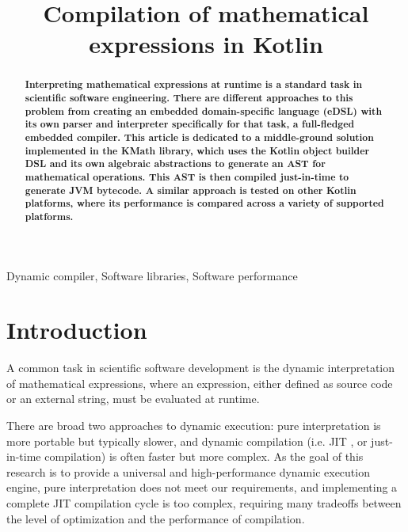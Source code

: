 \documentclass[conference]{IEEEtran}
\begin{document}
\title{Compilation of mathematical expressions in Kotlin}

\author{
}

\maketitle

\begin{abstract}
\textbf{Interpreting mathematical expressions at runtime is a standard task in scientific software engineering. There are different approaches to this problem from creating an embedded domain-specific language (eDSL) with its own parser and interpreter specifically for that task, a full-fledged embedded compiler. This article is dedicated to a middle-ground solution implemented in the KMath library, which uses the Kotlin object builder DSL and its own algebraic abstractions to generate an AST for mathematical operations. This AST is then compiled just-in-time to generate JVM bytecode. A similar approach is tested on other Kotlin platforms, where its performance is compared across a variety of supported platforms.}
\end{abstract}

\begin{IEEEkeywords}
Dynamic compiler, Software libraries, Software performance
\end{IEEEkeywords}

\section{Introduction}
A common task in scientific software development is the dynamic interpretation of mathematical expressions, where an expression, either defined as source code or an external string, must be evaluated at runtime.

There are broad two approaches to dynamic execution: pure interpretation is more portable but typically slower, and dynamic compilation (i.e. JIT \cite{jit}, or just-in-time compilation) is often faster but more complex. As the goal of this research is to provide a universal and high-performance dynamic execution engine, pure interpretation does not meet our requirements, and implementing a complete JIT compilation cycle is too complex, requiring many tradeoffs between the level of optimization and the performance of compilation. 
\end{document}
